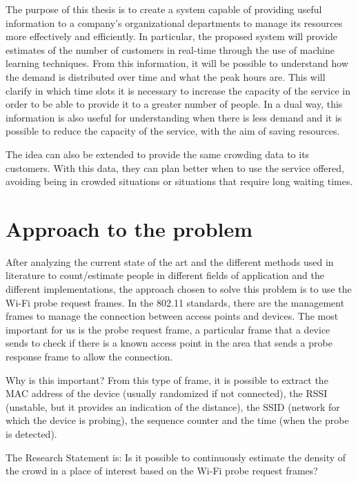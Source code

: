 The purpose of this thesis is to create a system capable of providing useful information to a company's organizational departments to manage its resources more effectively and efficiently. In particular, the proposed system will provide estimates of the number of customers in real-time through the use of machine learning techniques.
From this information, it will be possible to understand how the demand is distributed over time and what the peak hours are. This will clarify in which time slots it is necessary to increase the capacity of the service in order to be able to provide it to a greater number of people. In a dual way, this information is also useful for understanding when there is less demand and it is possible to reduce the capacity of the service, with the aim of saving resources.

The idea can also be extended to provide the same crowding data to its customers. With this data, they can plan better when to use the service offered, avoiding being in crowded situations or situations that require long waiting times.


\section{Approach to the problem} 
\label{sec:approach}
\vspace{0.2 cm} 

After analyzing the current state of the art and the different methods used in literature to count/estimate people in different fields of application and the different implementations, the approach chosen to solve this problem is to use the Wi-Fi probe request frames.
In the 802.11 standards, there are the management frames to manage the connection between access points and devices. The most important for us is the probe request frame, a particular frame that a device sends to check if there is a known access point in the area that sends a probe response frame to allow the connection.

Why is this important? From this type of frame, it is possible to extract the MAC address of the device (usually randomized if not connected), the RSSI (unstable, but it provides an indication of the distance), the SSID (network for which the device is probing), the sequence counter and the time (when the probe is detected).

The Research Statement is: Is it possible to continuously estimate the density of the crowd in a place of interest based on the Wi-Fi probe request frames?

